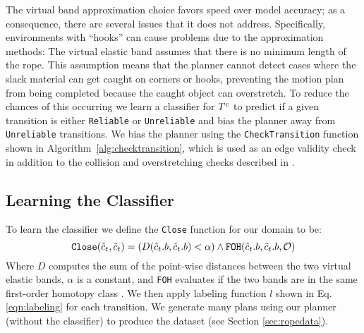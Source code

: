 The virtual band approximation choice favors speed over model accuracy; as a consequence, there are several issues that it does not address. Specifically, environments with ``hooks'' can cause problems due to the approximation methods: The virtual elastic band assumes that there is no minimum length of the rope. This assumption means that the planner cannot detect cases where the slack material can get caught on corners or hooks, preventing the motion plan from being completed because the caught object can overstretch. To reduce the chances of this occurring we learn a classifier for $T^c$ to predict if a given transition is either \texttt{Reliable} or \texttt{Unreliable} and bias the planner away from \texttt{Unreliable} transitions. We bias the planner using the \texttt{CheckTransition} function shown in Algorithm~\ref{alg:checktransition}, which is used as an edge validity check in addition to the collision and overstretching checks described in \cite{McConachie2020}.





\subsection{Learning the Classifier}

To learn the classifier we define the \texttt{Close} function for our domain to be:
$$
\texttt{Close}(\hat {c}_t, \tilde {c}_t) = \left( D(\hat {c}_t.b, \tilde {c}_t.b) < \alpha \right) \land \texttt{FOH}(\hat {c}_t.b, \tilde {c}_t.b,\mathcal{O})
$$
\noindent Where $D$ computes the sum of the point-wise distances between the two virtual elastic bands, $\alpha$ is a constant, and \texttt{FOH} evaluates if the two bands are in the same first-order homotopy class \cite{Jaillet2008}. We then apply labeling function $l$ shown in Eq. \ref{eqn:labeling} for each transition. We generate many plans using our planner (without the classifier) to produce the dataset (see Section \ref{sec:ropedata}).



